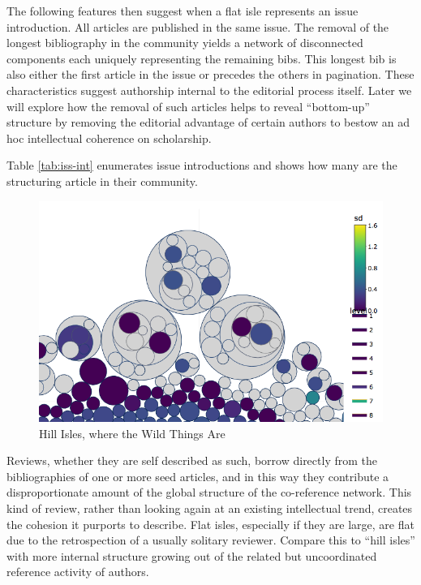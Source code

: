 \documentclass[]{book}
\theoremstyle{definition}
\theoremstyle{definition}
\theoremstyle{definition}
\theoremstyle{remark}
\begin{document}
The following features then suggest when a flat isle represents an issue
introduction. All articles are published in the same issue. The removal
of the longest bibliography in the community yields a network of
disconnected components each uniquely representing the remaining bibs.
This longest bib is also either the first article in the issue or
precedes the others in pagination. These characteristics suggest
authorship internal to the editorial process itself. Later we will
explore how the removal of such articles helps to reveal ``bottom-up''
structure by removing the editorial advantage of certain authors to
bestow an ad hoc intellectual coherence on scholarship.

Table \ref{tab:iss-int} enumerates issue introductions and shows how
many are the structuring article in their community.

\begin{figure}

{\centering \includegraphics[width=9.72in]{img/hill-isle} 

}

\caption{Hill Isles, where the Wild Things Are}\label{fig:hill-isle}
\end{figure}

Reviews, whether they are self described as such, borrow directly from
the bibliographies of one or more seed articles, and in this way they
contribute a disproportionate amount of the global structure of the
co-reference network. This kind of review, rather than looking again at
an existing intellectual trend, creates the cohesion it purports to
describe. Flat isles, especially if they are large, are flat due to the
retrospection of a usually solitary reviewer. Compare this to ``hill
isles'' with more internal structure growing out of the related but
uncoordinated reference activity of authors.
\end{document}
